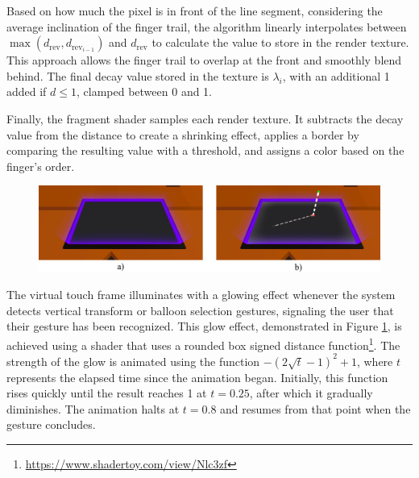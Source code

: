 


        Based on how much the pixel is in front of the line segment, considering the average inclination of the finger trail, the algorithm linearly interpolates between \(\max\left(d_{\text{rev}}, d_{\text{rev}_{i-1}}\right)\) and \(d_{\text{rev}}\) to calculate the value to store in the render texture. This approach allows the finger trail to overlap at the front and smoothly blend behind. The final decay value stored in the texture is \(\lambda_i\), with an additional 1 added if \(d \leq 1\), clamped between 0 and 1.

        Finally, the fragment shader samples each render texture. It subtracts the decay value from the distance to create a shrinking effect, applies a border by comparing the resulting value with a threshold, and assigns a color based on the finger's order.

        \begin{figure}[h!]
            \centering
            \includegraphics[width=1\textwidth]{figures/frame_glow.png}
            \label{fig:frame_glow}
        \end{figure}

        The virtual touch frame illuminates with a glowing effect whenever the system detects vertical transform or balloon selection gestures, signaling the user that their gesture has been recognized. This glow effect, demonstrated in Figure \ref{fig:frame_glow}, is achieved using a shader that uses a rounded box signed distance function\footnote{\url{https://www.shadertoy.com/view/Nlc3zf}}. The strength of the glow is animated using the function $-\left(2 \sqrt{t} - 1\right)^2 + 1$, where \(t\) represents the elapsed time since the animation began. Initially, this function rises quickly until the result reaches 1 at $t = 0.25$, after which it gradually diminishes. The animation halts at \(t = 0.8\) and resumes from that point when the gesture concludes.
                    


